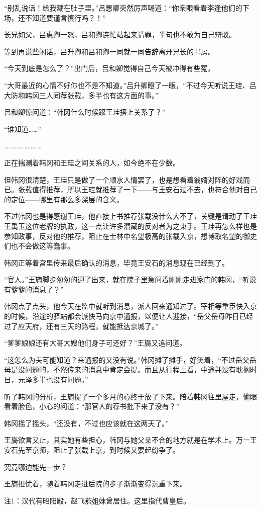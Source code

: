 “别乱说话！给我藏在肚子里。”吕惠卿突然厉声喝道：“你亲眼看着李逢他们的下场，还不知道要谨言慎行吗？！”

长兄如父，吕惠卿一怒，吕和卿连忙站起来请罪，半句也不敢为自己辩驳。

等到再说些闲话，吕升卿和吕和卿一同就一同告辞离开兄长的书房。

“今天到底是怎么了？”出门后，吕和卿觉得自己今天被冲得有些冤，

“大哥最近的心情不好你也不是不知道。”吕升卿瞪了一眼，“不过今天听说王珪、吕大防和韩冈三人同荐张载，多半也有这方面的事。”

吕和卿惊问道：“韩冈什么时候跟王珪搭上关系了？”

“谁知道……”

……………………

正在揣测着韩冈和王珪之间关系的人，如今绝不在少数。

但韩冈很清楚，王珪只是做了一个顺水人情罢了，也是想看着翁婿对阵的好戏而已。张载值得推荐，所以王珪就推荐了一下——与王安石过不去，也符合他对自己的定位——哪里有那么多深层的含义。

不过韩冈也是得感谢王珪，他直接上书推荐张载没什么大不了，关键是请动了王珪王禹玉这位老牌的执政，这一点让许多潜藏的反对者为之束手。王珪再怎么样也是参知政事，反对他的推荐，阻止在士林中名望极高的张载入京，想博取名望的御史们也不会做这等蠢事。

韩冈正等着宫里传来最后确认的消息，毕竟王安石的消息现在已经到了。

“官人。”王旖脚步匆匆的迎了出来，就在院子里急问着刚刚走进家门的韩冈，“听说有爹爹的消息了？”

韩冈点了点头，他今天在监中就听到消息，派人回来通知过了。宰相等重臣快入京的时候，沿途的驿站都会派快马向京中通报，以便让人迎接，“岳父岳母昨日已经过了应天府，还有三天的路程，就能抵达京城了。”

“爹爹娘娘还有大哥大嫂他们身子可还好？”王旖又追问道。

“这怎么为夫可能知道？来通报的又没有说。”韩冈摊了摊手，好笑着，“不过岳父岳母是没问题的，不然传来的消息中肯定会提。而且从行程上看，中途并没有耽搁时日，元泽多半也没有问题。”

听了韩冈的分析，王旖提了一个多月的心终于放了下来。陪着韩冈往里屋走，偷眼看着脸色，小心的问道：“那官人的荐书批下来了没有？”

韩冈摇了摇头，“还没有，不过也应该就在这两天了。”

王旖欲言又止，其实她有些担心，韩冈与她父亲不合的地方就是在学术上。万一王安石先至京师，阻止了张载上京，到时候又要起纷争了。

究竟哪边能先一步？

王旖担忧着，随着韩冈走进后院的步子渐渐变得沉重下来。

注1：汉代有昭阳殿，赵飞燕姐妹曾居住。这里指代曹皇后。

